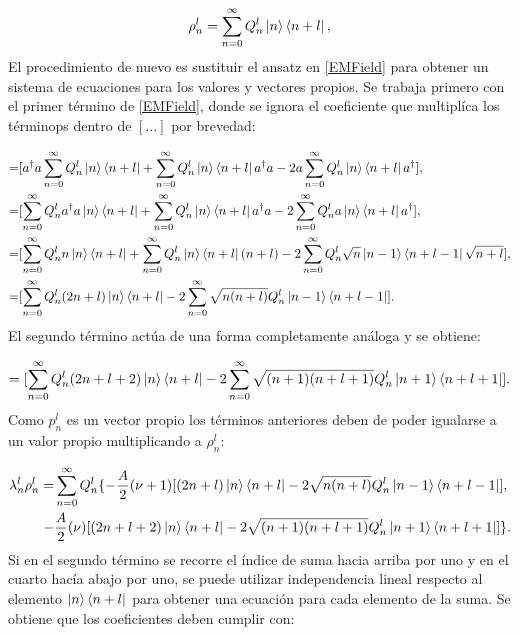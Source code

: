 \documentclass[a4paper,10pt]{report}
\begin{document}
\begin{equation}
 \rho^l_n = \sum_{n=0}^\infty Q_n^l\Ket{n}\Bra{n+l},
\end{equation} El procedimiento de nuevo es sustituir el ansatz en \eqref{EMField} para obtener un sistema de ecuaciones para los valores y vectores propios. Se trabaja primero con el primer término de \eqref{EMField}, donde se ignora el coeficiente que multiplíca los términops dentro de $[...]$ por brevedad:

\begin{align*}
=&[a^\dagger a\sum_{n=0}^\infty Q_n^l\Ket{n}\Bra{n+l} + \sum_{n=0}^\infty Q_n^l\Ket{n}\Bra{n+l} a^\dagger a -2a\sum_{n=0}^\infty Q_n^l\Ket{n}\Bra{n+l} a^\dagger],\\
=&[\sum_{n=0}^\infty Q_n^la^\dagger a\Ket{n}\Bra{n+l} + \sum_{n=0}^\infty Q_n^l\Ket{n}\Bra{n+l} a^\dagger a -2\sum_{n=0}^\infty Q_n^la\Ket{n}\Bra{n+l} a^\dagger],\\
=&[\sum_{n=0}^\infty Q_n^ln\Ket{n}\Bra{n+l} + \sum_{n=0}^\infty Q_n^l\Ket{n}\Bra{n+l} (n+l) -2\sum_{n=0}^\infty Q_n^l\sqrt{n}\Ket{n-1}\Bra{n+l-1}\sqrt{n+l}],\\
=&[\sum_{n=0}^\infty Q_n^l(2n+l)\Ket{n}\Bra{n+l} -2\sum_{n=0}^\infty\sqrt{n(n+l)} Q_n^l\Ket{n-1}\Bra{n+l-1}].\\
\end{align*} El segundo término actúa de una forma completamente análoga y se obtiene:

\begin{equation}
=[\sum_{n=0}^\infty Q_n^l(2n+l+2)\Ket{n}\Bra{n+l} -2\sum_{n=0}^\infty\sqrt{(n+1)(n+l+1)} Q_n^l\Ket{n+1}\Bra{n+l+1}].
\end{equation} Como $p^l_n$  es un vector propio los términos anteriores deben de poder igualarse a un valor propio multiplicando a $\rho^l_n$:

\begin{align}
\lambda_n^l \rho_n^l=& \sum_{n=0}^\infty Q_n^l \{ -\frac{A}{2}(\nu+1)[(2n+l)\Ket{n}\Bra{n+l} -2\sqrt{n(n+l)} Q_n^l\Ket{n-1}\Bra{n+l-1}] \nonumber, \\
-&\frac{A}{2}(\nu)[(2n+l+2)\Ket{n}\Bra{n+l}-2\sqrt{(n+1)(n+l+1)} Q_n^l\Ket{n+1}\Bra{n+l+1}]\}.
\end{align} Si en el segundo término se recorre el índice de suma hacia arriba por uno y en el cuarto hacía abajo por uno, se puede utilizar independencia lineal respecto al elemento $\Ket{n}\Bra{n+l}$ para obtener una ecuación para cada elemento de la suma. Se obtiene que los coeficientes deben cumplir con:
\end{document}
